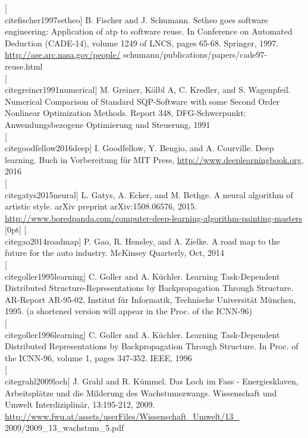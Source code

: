 \documentclass[10pt]{book}
\begin{document}
[\\cite{fischer1997setheo}] B. Fischer and J. Schumann. Setheo goes software engineering: Application of atp to software reuse. In Conference on Automated Deduction (CADE-14), volume 1249 of LNCS, pages 65-68. Springer, 1997. \href{http://ase.arc.nasa.gov/people/}{http://ase.arc.nasa.gov/people/} schumann/publications/papers/cade97-reuse.html\\[0pt]
[\\cite{greiner1991numerical}] M. Greiner, Kölbl A, C. Kredler, and S. Wagenpfeil. Numerical Comparison of Standard SQP-Software with some Second Order Nonlinear Optimization Methods. Report 348, DFG-Schwerpunkt: Anwendungsbezogene Optimierung und Steuerung, 1991\\[0pt]
[\\cite{goodfellow2016deep}] I. Goodfellow, Y. Bengio, and A. Courville. Deep learning. Buch in Vorbereitung für MIT Press, \href{http://www.deeplearningbook.org}{http://www.deeplearningbook.org}, 2016\\[0pt]
[\\cite{gatys2015neural}] L. Gatys, A. Ecker, and M. Bethge. A neural algorithm of artistic style. arXiv preprint arXiv:1508.06576, 2015. \href{http://www.boredpanda.com/computer-deep-learning-algorithm-painting-masters}{http://www.boredpanda.com/computer-deep-learning-algorithm-painting-masters}\\
[0pt]
[\\cite{gao2014roadmap}] P. Gao, R. Hensley, and A. Zielke. A road map to the future for the auto industry. McKinsey Quarterly, Oct, 2014\\[0pt]
[\\cite{goller1995learning}] C. Goller and A. Küchler. Learning Task-Dependent Distributed Structure-Representations by Backpropagation Through Structure. AR-Report AR-95-02, Institut für Informatik, Technische Universität München, 1995. (a shortened version will appear in the Proc. of the ICNN-96)\\[0pt]
[\\cite{goller1996learning}] C. Goller and A. Küchler. Learning Task-Dependent Distributed Representations by Backpropagation Through Structure. In Proc. of the ICNN-96, volume 1, pages 347-352. IEEE, 1996\\[0pt]
[\\cite{grahl2009loch}] J. Grahl and R. Kümmel. Das Loch im Fass - Energiesklaven, Arbeitsplätze und die Milderung des Wachstumszwangs. Wissenschaft und Umwelt Interdiziplinär, 13:195-212, 2009. \href{http://www.fwu.at/assets/userFiles/Wissenschaft_Umwelt/13_}{http://www.fwu.at/assets/userFiles/Wissenschaft\_Umwelt/13\_} 2009/2009\_13\_wachstum\_5.pdf\\[0pt]
\end{document}

